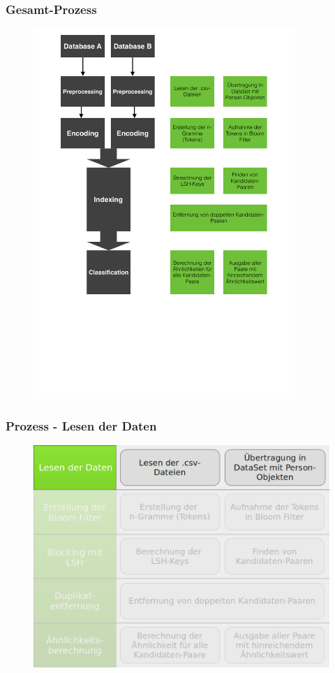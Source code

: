 \documentclass{beamer}
\begin{document}
    \begin{frame}
    		\frametitle{Gesamt-Prozess}
    		\begin{figure}[H]
    			\includegraphics[height=14cm]{graphics/pprl.pdf}
    		\end{figure}
    \end{frame}
    
    \begin{frame}
    		\frametitle{Prozess - Lesen der Daten}
    		\begin{figure}[H]
    			\includegraphics[width=\textwidth]{graphics/process_1.png}
    		\end{figure}
    \end{frame}
    
\end{document}
